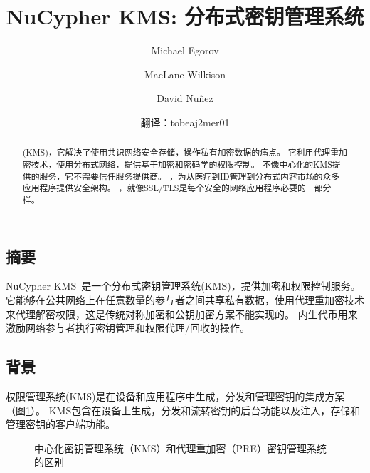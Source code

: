 \documentclass[longbibliography,nofootinbib]{revtex4-1}
\newcommand{\kms}{NuCypher KMS}
\begin{document}
\begin{CJK*}{UTF8}{gbsn}
\renewcommand{\tocname}{内容}
\renewcommand{\figurename}{图}
\newcommand{\figref}[1]{图\ref{#1}}

\title{\kms: 分布式密钥管理系统}

\author{Michael Egorov}
\author{MacLane Wilkison}

\author{David Nu{\~n}ez}

\author{翻译：tobeaj2mer01}

\begin{abstract}
    (KMS)，它解决了使用共识网络安全存储，操作私有加密数据的痛点\cite{cryptoeprint:2017:201}。
    它利用代理重加密技术，使用分布式网络，提供基于加密和密码学的权限控制\cite{wiki:pre}。
    不像中心化的KMS提供的服务，它不需要信任服务提供商。
    ，为从医疗到ID管理到分布式内容市场的众多应用程序提供安全架构。
    ，就像SSL/TLS是每个安全的网络应用程序必要的一部分一样。
\end{abstract}

\maketitle

\tableofcontents

\newpage

\section{摘要}

\kms~是一个分布式密钥管理系统(KMS)，提供加密和权限控制服务。
它能够在公共网络上在任意数量的参与者之间共享私有数据，使用代理重加密技术来代理解密权限，这是传统对称加密和公钥加密方案不能实现的。
内生代币用来激励网络参与者执行密钥管理和权限代理/回收的操作。

\subsection{背景}
权限管理系统(KMS)是在设备和应用程序中生成，分发和管理密钥的集成方案（\figref{fig:kms}）。
KMS包含在设备上生成，分发和流转密钥的后台功能以及注入，存储和管理密钥的客户端功能\cite{wiki:kms}。

\begin{figure}
    \centering
    \qquad
    \qquad
    \caption{中心化密钥管理系统（KMS）和代理重加密（PRE）密钥管理系统的区别}
    \label{fig:kms}
\end{figure}


\end{CJK*}
\end{document}
